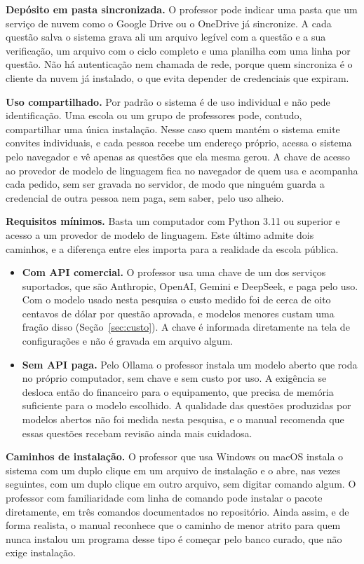 \textbf{Depósito em pasta sincronizada.} O professor pode indicar uma pasta que um serviço de nuvem
como o Google Drive ou o OneDrive já sincronize. A cada questão salva o sistema grava ali um arquivo
legível com a questão e a sua verificação, um arquivo com o ciclo completo e uma planilha com uma
linha por questão. Não há autenticação nem chamada de rede, porque quem sincroniza é o cliente da
nuvem já instalado, o que evita depender de credenciais que expiram.

\textbf{Uso compartilhado.} Por padrão o sistema é de uso individual e não pede identificação. Uma
escola ou um grupo de professores pode, contudo, compartilhar uma única instalação. Nesse caso quem
mantém o sistema emite convites individuais, e cada pessoa recebe um endereço próprio, acessa o
sistema pelo navegador e vê apenas as questões que ela mesma gerou. A chave de acesso ao provedor
de modelo de linguagem fica no navegador de quem usa e acompanha cada pedido, sem ser gravada no
servidor, de modo que ninguém guarda a credencial de outra pessoa nem paga, sem saber, pelo uso
alheio.

\textbf{Requisitos mínimos.} Basta um computador com Python 3.11 ou superior e acesso a um provedor
de modelo de linguagem. Este último admite dois caminhos, e a diferença entre eles importa para a
realidade da escola pública.

\begin{itemize}
\item \textbf{Com API comercial.} O professor usa uma chave de um dos serviços suportados, que são
  Anthropic, OpenAI, Gemini e DeepSeek, e paga pelo uso. Com o modelo usado nesta pesquisa o custo
  medido foi de cerca de oito centavos de dólar por questão aprovada, e modelos menores custam uma
  fração disso (Seção~\ref{sec:custo}). A chave é informada diretamente na tela de configurações e
  não é gravada em arquivo algum.
\item \textbf{Sem API paga.} Pelo Ollama o professor instala um modelo aberto que roda no próprio
  computador, sem chave e sem custo por uso. A exigência se desloca então do financeiro para o
  equipamento, que precisa de memória suficiente para o modelo escolhido. A qualidade das questões
  produzidas por modelos abertos não foi medida nesta pesquisa, e o manual recomenda que essas
  questões recebam revisão ainda mais cuidadosa.
\end{itemize}

\textbf{Caminhos de instalação.} O professor que usa Windows ou macOS instala o sistema com um
duplo clique em um arquivo de instalação e o abre, nas vezes seguintes, com um duplo clique em outro
arquivo, sem digitar comando algum. O professor com familiaridade com linha de comando pode instalar o
pacote diretamente, em três comandos documentados no repositório. Ainda assim, e de forma realista,
o manual reconhece que o caminho de menor atrito para quem nunca instalou um programa desse tipo é
começar pelo banco curado, que não exige instalação.

